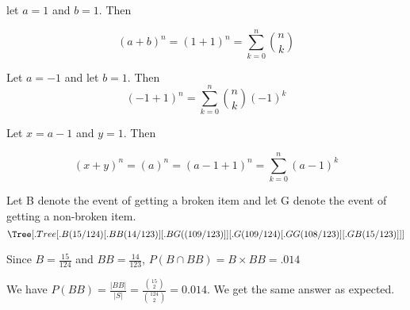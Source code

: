 \documentclass[11pt,largemargins]{homework}
\begin{document}
\maketitle

\question
\begin{alphaparts}
\questionpart 
let $a = 1$ and $b = 1$. Then 

\[(a + b)^n = ( 1 + 1 )^n =  \sum_{k = 0}^{n} {n \choose k} \]

\questionpart 
Let $a = -1$ and let $b = 1$. Then 
\[ (-1 + 1)^n = \sum_{k = 0}^n {n \choose k} (-1)^k \]

\questionpart
Let $x = a - 1$ and $y = 1$. Then 

\[(x + y)^n =(a)^n = (a - 1 + 1)^n = \sum_{k = 0}^{n}(a - 1)^k \]
\end{alphaparts}
\question
\begin{alphaparts}
\questionpart 
Let B denote the event of getting a broken item and let G denote the event of getting a non-broken item. 
\[\Tree [.Tree [.B(15/124) [.BB(14/123) ] [.BG((109/123) ]] [.G(109/124) [.GG(108/123) ] [.GB(15/123) ]]]  \]   

\questionpart 

Since $B = \frac{15}{124}$ and $BB = \frac{14}{123}$, $P(B \cap BB) = B \times BB = .014 $

\questionpart
We have $P(BB) = \frac{|BB|}{|S|} = \frac{{15 \choose 2}}{{124 \choose 2}} = 0.014$. We get the same answer as expected.

\end{alphaparts}
\end{document}
